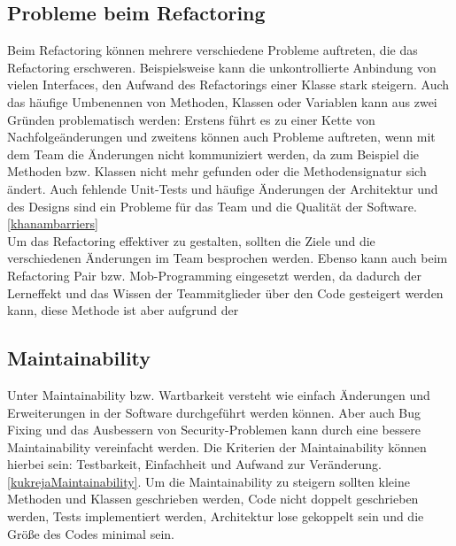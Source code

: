 \subsection{Probleme beim Refactoring}
Beim Refactoring können mehrere verschiedene Probleme auftreten, die das Refactoring erschweren. Beispielsweise kann die unkontrollierte Anbindung von vielen Interfaces, den Aufwand des Refactorings einer Klasse stark steigern. Auch das häufige Umbenennen von Methoden, Klassen oder Variablen kann aus zwei Gründen problematisch werden: Erstens führt es zu einer Kette von Nachfolgeänderungen und zweitens können auch Probleme auftreten, wenn mit dem Team die Änderungen nicht kommuniziert werden, da zum Beispiel die Methoden bzw. Klassen nicht mehr gefunden oder die Methodensignatur sich ändert. Auch fehlende Unit-Tests und häufige Änderungen der Architektur und des Designs sind ein Probleme für das Team und die Qualität der Software. \ref{khanambarriers} \\
Um das Refactoring effektiver zu gestalten, sollten die Ziele und die verschiedenen Änderungen im Team besprochen werden. Ebenso kann auch beim Refactoring Pair bzw. Mob-Programming eingesetzt werden, da dadurch der Lerneffekt und das Wissen der Teammitglieder über den Code gesteigert werden kann, diese Methode ist aber aufgrund der 
\subsection{Maintainability}
Unter Maintainability bzw. Wartbarkeit versteht wie einfach Änderungen und Erweiterungen in der Software durchgeführt werden können. Aber auch Bug Fixing und das Ausbessern von Security-Problemen kann durch eine bessere Maintainability vereinfacht werden. Die Kriterien der Maintainability können hierbei sein: Testbarkeit, Einfachheit und Aufwand zur Veränderung. \ref{kukrejaMaintainability}. Um die Maintainability zu steigern sollten kleine Methoden und Klassen geschrieben werden, Code nicht doppelt geschrieben werden, Tests implementiert werden, Architektur lose gekoppelt sein und die Größe des Codes minimal sein.
\chapterend